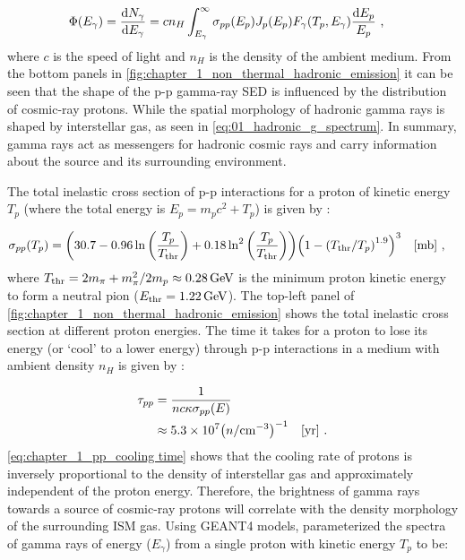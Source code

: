 \begin{equation}
    \begin{aligned}
	\Phi\qty(E_\gamma)&=\dv{N_\gamma}{E_\gamma}=cn_H\int_{E_\gamma}^\infty\sigma_{pp}\qty(E_p)J_p\qty(E_p)F_\gamma\qty(T_p,E_\gamma)\frac{\dd{E_p}}{E_p}\text{ ,}
\end{aligned} \label{eq:01_hadronic_g_spectrum}
\end{equation}
\noindent where $c$ is the speed of light and $n_H$ is the density of the ambient medium.
From the bottom panels in \autoref{fig:chapter_1_non_thermal_hadronic_emission} it can be seen that the shape of the p-p gamma-ray SED is influenced by the distribution of cosmic-ray protons. While the spatial morphology of hadronic gamma rays is shaped by interstellar gas, as seen in \autoref{eq:01_hadronic_g_spectrum}. In summary, gamma rays act as messengers for hadronic cosmic rays and carry information about the source and its surrounding environment.

The total inelastic cross section of p-p interactions for a proton of kinetic energy $T_p$ (where the total energy is $E_p=m_pc^2+T_p$) is given by \citep{2014PhRvD..90l3014K}:

\begin{equation}
    \begin{aligned}
    \sigma_{pp}\qty(T_p) &= \qty(30.7-0.96\ln\qty(\frac{T_p}{T_\text{thr}})+0.18\ln^2\qty(\frac{T_p}{T_\text{thr}}))\qty(1-\qty(T_\text{thr}/T_p)^{1.9})^3\quad\qty[\si{\milli\barn}]\text{ ,}
    \end{aligned} \label{eq:chapter1_non_thermal_pp_cross_section}
\end{equation}
\noindent where $T_\text{thr}=2m_\pi + m_\pi^2/2m_p \approx 0.28\,\GeV$ is the minimum proton kinetic energy to form a neutral pion ($E_\text{thr}=1.22\,\GeV$). The top-left panel of \autoref{fig:chapter_1_non_thermal_hadronic_emission} shows the total inelastic cross section at different proton energies.
\newpar
The time it takes for a proton to lose its energy (or `cool' to a lower energy) through p-p interactions in a medium with ambient density $n_H$ is given by \citep{2009ARA&A..47..523H}:

\begin{equation}
    \begin{aligned}
	\tau_{pp} &= \frac{1}{nc\kappa\sigma_{pp}\qty(E)} \\
	&\approx 5.3\times 10^7\qty(n/\centimeterminusthree)^{-1}\quad\qty[\si{yr}]\text{ .}
\end{aligned} \label{eq:chapter_1_pp_cooling time}
\end{equation}
\noindent \autoref{eq:chapter_1_pp_cooling time} shows that the cooling rate of protons is inversely proportional to the density of interstellar gas and approximately independent of the proton energy. Therefore, the brightness of gamma rays towards a source of cosmic-ray protons will correlate with the density morphology of the surrounding ISM gas.
\newpar 
Using GEANT4 models, \cite{2014PhRvD..90l3014K} parameterized the spectra of gamma rays of energy ($E_\gamma$) from a single proton with kinetic energy $T_p$ to be:

